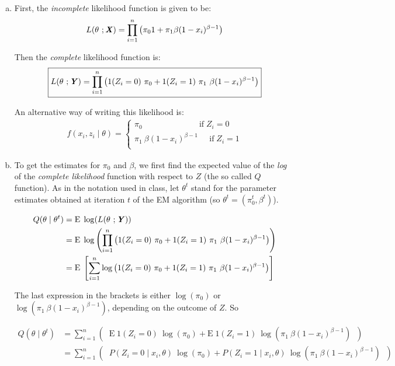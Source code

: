 \documentclass[12pt]{article}
\newcommand{\blditX}{\textbf{\textit{X}}}
\newcommand{\blditY}{\textbf{\textit{Y}}}
\begin{document}
  
\begin{enumerate}[(a)]  
\item First, the \emph{incomplete} likelihood function is given to be:
  $$
  L(\theta \ ; \blditX) = \prod_{i=1}^n \left(   \pi_0 1 + \pi_1 \beta (1 - x_i)^{\beta - 1}   \right)
  $$



Then the \emph{complete} likelihood function is:
$$\boxed{
L(\theta \ ; \blditY) = \prod_{i=1}^n \left( 1 (Z_i = 0) \ \pi_0  + 1( Z_i = 1) \ \pi_1 \ \beta (1 - x_i)^{\beta - 1} \right) }
$$ 
  
  An alternative way of writing this likelihood is:
  \begin{align*}
   f(x_i, z_i \mid \theta) = 
  \begin{cases}
  \pi_0 \; \; \; \; \; \; \; \; \; \; \; \; \; \; \; \; \; \; \; \; \; \; \; \; \; \text{if} \; Z_i = 0\\
  \pi_1 \ \beta (1 - x_i)^{\beta - 1}\; \; \; \; \; \text{if}  \; Z_i = 1\\
  \end{cases}
  \end{align*}


\item To get the estimates for $\pi_0$ and $\beta$, we first find the expected value of the \emph{log} of the \emph{complete likelihood} function with respect to $Z$ (the so called $Q$ function). As in the notation used in class, let $\theta^t$ stand for the parameter estimates obtained at iteration $t$ of the EM algorithm (so $\theta^t = (\pi_0^t, \beta^t)$).

\begin{align*}
Q(\theta \mid \theta^t) &= \mathrm{E} \; \log (L(\theta \ ; \blditY) ) \\
&= \mathrm{E} \; \log \left( \prod_{i=1}^n \left( 1 (Z_i = 0)\ \pi_0   + 1( Z_i = 1)\ \pi_1  \ \beta (1 - x_i)^{\beta - 1} \right) \right)\\
&= \mathrm{E} \; \left[ \sum_{i=1}^n  \log \left( 1 (Z_i = 0)\ \pi_0   + 1( Z_i = 1)\ \pi_1 \ \beta (1 - x_i)^{\beta - 1} \right) \right] \\
\end{align*}
  
  The last expression in the brackets is either $\log(\pi_0)$ or $ \log(\pi_1\ \beta (1 - x_i)^{\beta - 1})$, depending on the outcome of $Z$. So
  
\begin{align*}
Q(\theta \mid \theta^t) &= \sum_{i=1}^n \left( \; \; \mathrm{E} \; 1 (Z_i = 0)\ \log(\pi_0) + \mathrm{E} \; 1 (Z_i = 1)\ \log(\pi_1\ \beta (1 - x_i)^{\beta - 1}) \; \; \right) \\
&= \sum_{i=1}^n \left( \; \; P(Z_i = 0 \mid x_i, \theta)\ \log(\pi_0) +  P(Z_i = 1 \mid x_i, \theta)\ \log(\pi_1\ \beta (1 - x_i)^{\beta - 1}) \; \; \right) \\
\end{align*}
  

\end{enumerate}
\end{document}
